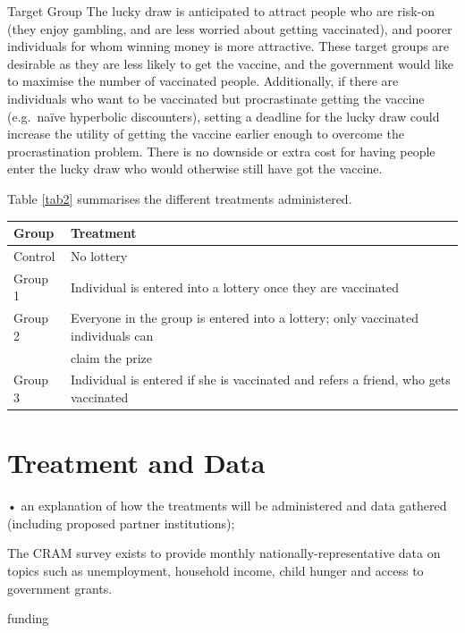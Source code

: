 \documentclass[11pt,preprint, authoryear]{elsarticle}
\let\origtable\table
\let\endorigtable\endtable
\renewenvironment{table}[1][2] {
    \expandafter\origtable\expandafter[H]
} {
    \endorigtable
}
\numberwithin{equation}{section}
\numberwithin{figure}{section}
\numberwithin{table}{section}
\begin{document}
Target Group The lucky draw is anticipated to attract people who are
risk-on (they enjoy gambling, and are less worried about getting
vaccinated), and poorer individuals for whom winning money is more
attractive. These target groups are desirable as they are less likely to
get the vaccine, and the government would like to maximise the number of
vaccinated people. Additionally, if there are individuals who want to be
vaccinated but procrastinate getting the vaccine (e.g.~naïve hyperbolic
discounters), setting a deadline for the lucky draw could increase the
utility of getting the vaccine earlier enough to overcome the
procrastination problem. There is no downside or extra cost for having
people enter the lucky draw who would otherwise still have got the
vaccine.

Table \ref{tab2} summarises the different treatments administered.

\begin{table}[H]
\centering
\begin{tabular}{ll}
  \toprule
Group & Treatment \\ 
  \midrule
Control & No lottery \\ 
  Group 1 & Individual is entered into a lottery once they are vaccinated \\ 
  Group 2 & Everyone in the group is entered into a lottery; only vaccinated individuals can \\ 
   & claim the prize \\ 
  Group 3 & Individual is entered if she is vaccinated and refers a friend, who gets vaccinated \\ 
   \bottomrule
\end{tabular}
\caption{Treatment Summary \label{tab2}} 
\end{table}

\hypertarget{treatment-and-data}{%
\section{\texorpdfstring{Treatment and Data
\label{treatment}}{Treatment and Data }}\label{treatment-and-data}}

• an explanation of how the treatments will be administered and data
gathered (including proposed partner institutions);

The CRAM survey exists to provide monthly nationally-representative data
on topics such as unemployment, household income, child hunger and
access to government grants.

funding
\end{document}
